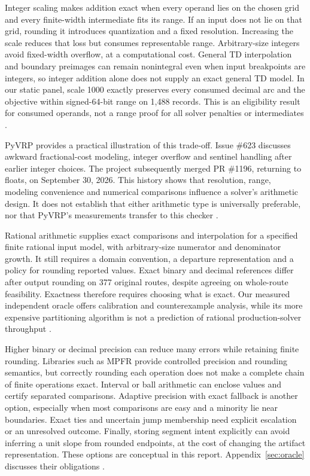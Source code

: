 \documentclass[11pt]{article}
\begin{document}
Integer scaling makes addition exact when every operand lies on the chosen grid and every finite-width intermediate fits its range. If an input does not lie on that grid, rounding it introduces quantization and a fixed resolution. Increasing the scale reduces that loss but consumes representable range. Arbitrary-size integers avoid fixed-width overflow, at a computational cost. General TD interpolation and boundary preimages can remain nonintegral even when input breakpoints are integers, so integer addition alone does not supply an exact general TD model. In our static panel, scale 1000 exactly preserves every consumed decimal arc and the objective within signed-64-bit range on 1,488 records. This is an eligibility result for consumed operands, not a range proof for all solver penalties or intermediates \autocite{rascoussierImpactScalingRounding2026}.

PyVRP provides a practical illustration of this trade-off. Issue \#623 discusses awkward fractional-cost modeling, integer overflow and sentinel handling after earlier integer choices. The project subsequently merged PR \#1196, returning to floats, on September 30, 2026. This history shows that resolution, range, modeling convenience and numerical comparisons influence a solver's arithmetic design. It does not establish that either arithmetic type is universally preferable, nor that PyVRP's measurements transfer to this checker \autocite{woudaDoubles2024,woudaFloats2026}.

Rational arithmetic supplies exact comparisons and interpolation for a specified finite rational input model, with arbitrary-size numerator and denominator growth. It still requires a domain convention, a departure representation and a policy for rounding reported values. Exact binary and decimal references differ after output rounding on 377 original routes, despite agreeing on whole-route feasibility. Exactness therefore requires choosing what is exact. Our measured independent oracle offers calibration and counterexample analysis, while its more expensive partitioning algorithm is not a prediction of rational production-solver throughput \autocite{zippoNancy2022,zippoPseudoInverseComposition2023}.

Higher binary or decimal precision can reduce many errors while retaining finite rounding. Libraries such as MPFR provide controlled precision and rounding semantics, but correctly rounding each operation does not make a complete chain of finite operations exact. Interval or ball arithmetic can enclose values and certify separated comparisons. Adaptive precision with exact fallback is another option, especially when most comparisons are easy and a minority lie near boundaries. Exact ties and uncertain jump membership need explicit escalation or an unresolved outcome. Finally, storing segment intent explicitly can avoid inferring a unit slope from rounded endpoints, at the cost of changing the artifact representation. These options are conceptual in this report. Appendix~\ref{sec:oracle} discusses their obligations \autocite{mpfrManual2025,johanssonArb2017}.
\end{document}
